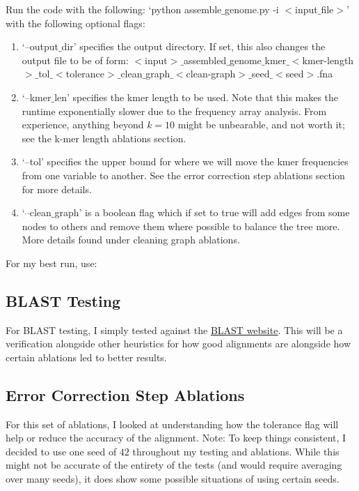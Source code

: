 \documentclass[10pt]{article}
\begin{document}
Run the code with the following: `python assemble$\_$genome.py -i $<$input$\_$file$>$' with the following optional flags:
\begin{enumerate}
  \item `--output$\_$dir' specifies the output directory. If set, this also changes the output file to be of form: $<$input$>\_$assembled$\_$genome$\_$kmer$\_<$kmer-length$>\_$tol$\_<$tolerance$>\_$clean$\_$graph$\_<$clean-graph$>\_$seed$\_<$seed$>$.fna
  \item `--kmer$\_$len' specifies the kmer length to be used. Note that this makes the runtime exponentially slower due to the frequency array analysis. From experience, anything beyond $k=10$ might be unbearable, and not worth it; see the k-mer length ablations section.
  \item `--tol' specifies the upper bound for where we will move the kmer frequencies from one variable to another. See the error correction step ablations section for more details.
  \item `--clean$\_$graph' is a boolean flag which if set to true will add edges from some nodes to others and remove them where possible to balance the tree more. More details found under cleaning graph ablations.
\end{enumerate}

For my best run, use: 


\subsection*{BLAST Testing}
For BLAST testing, I simply tested against the \href{https://blast.ncbi.nlm.nih.gov/Blast.cgi?PROGRAM=blastn&PAGE_TYPE=BlastSearch&LINK_LOC=blasthome}{BLAST website}. This will be a verification alongside other heuristics for how good alignments are alongside how certain ablations led to better results.

\subsection*{Error Correction Step Ablations}
For this set of ablations, I looked at understanding how the tolerance flag will help or reduce the accuracy of the alignment. Note: To keep things consistent, I decided to use one seed of $42$ throughout my testing and ablations. While this might not be accurate of the entirety of the tests (and would require averaging over many seeds), it does show some possible situations of using certain seeds.\\
\end{document}
